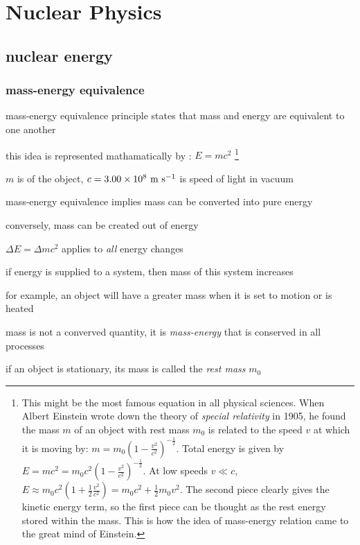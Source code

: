 \section{Nuclear Physics}

\subsection{nuclear energy}

\subsubsection{mass-energy equivalence}

mass-energy equivalence principle states that mass and energy are equivalent to one another

this idea is represented mathamatically by : $\boxed{E=mc^2}$
\footnote{This might be the most famous equation in all physical sciences. When Albert Einstein wrote down the theory of \emph{special relativity} in 1905, he found the mass $m$ of an object with rest mass $m_0$ is related to the speed $v$ at which it is moving by: $m=m_0 \left(1-\frac{v^2}{c^2}\right)^{-\frac{1}{2}}$. Total energy is given by $E=mc^2=m_0 c^2 \left(1-\frac{v^2}{c^2}\right)^{-\frac{1}{2}}$. At low speeds $v \ll c$, $E \approx m_0 c^2 \left(1+\frac{1}{2}\frac{v^2}{c^2}\right) = m_0 c^2 + \frac{1}{2}m_0 v^2$. The second piece clearly gives the kinetic energy term, so the first piece can be thought as the rest energy stored within the mass. This is how the idea of mass-energy relation came to the great mind of Einstein.}

$m$ is  of the object, $c = 3.00\times10^8 \text{ m s$^{-1}$}$ is speed of light in vacuum

\cmt mass-energy equivalence implies mass can be converted into pure energy

conversely, mass can be created out of energy

\cmt $\Delta E = \Delta m c^2$ applies to \emph{all} energy changes

if energy is supplied to a system, then mass of this system increases

for example, an object will have a greater mass when it is set to motion or is heated

mass is not a converved quantity, it is \emph{mass-energy} that is conserved in all processes

\cmt if an object is stationary, its mass is called the \emph{rest mass} $m_0$

